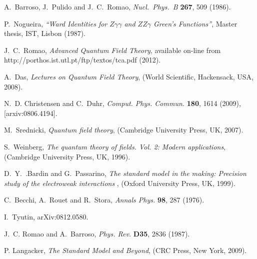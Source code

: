 \documentclass{ws-ijmpa}
\begin{document}
\begin{thebibliography}{00}
A.~Barroso, J.~Pulido and J.~C.~Romao,
\textit{Nucl.\ Phys.\ B} \textbf{267}, 509 (1986).

P.~Nogueira,
\textit{``Ward Identities for $Z \gamma \gamma$ and
$Z Z \gamma$ Green's Functions''},
Master thesis,
IST, Lisbon (1987).


J.~C.~Romao,
\textit{Advanced Quantum Field Theory},
available on-line from http://porthos.ist.utl.pt/ftp/textos/tca.pdf (2012).


A.~Das,
\textit{Lectures on Quantum Field Theory},
(World Scientific, Hackensack, USA, 2008).

N.~D. Christensen and C.~Duhr,
\textit{Comput. Phys. Commun.}
\textbf{180}, 1614 (2009), [arxiv:0806.4194].
%

M.~Srednicki,
\textit{Quantum field theory},
(Cambridge University Press, UK, 2007).

S.~Weinberg,
\textit{The quantum theory of fields. Vol. 2: Modern applications},
(Cambridge University Press, UK, 1996).

D.~Y.~.Bardin and G.~Passarino,
\textit{The standard model in the making: Precision study of the electroweak interactions} ,
(Oxford University Press, UK, 1999).


C.~Becchi, A.~Rouet and R.~Stora,
\textit{Annals Phys.} {\bf 98}, 287 (1976).

I.~Tyutin,
arXiv:0812.0580.

J.~C. Romao and A.~Barroso,
\textit{Phys. Rev.} {\bf D35}, 2836 (1987).

P. Langacker,
\textit{The Standard Model and Beyond},
(CRC Press, New York, 2009).

\end{thebibliography}
\end{document}
